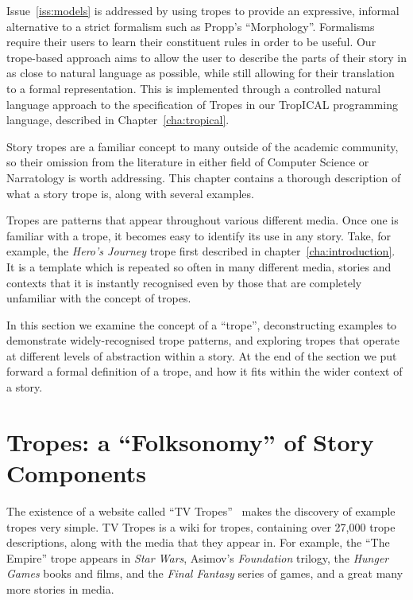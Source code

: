 \documentclass[11pt]{report}
\begin{document}
Issue~\ref{iss:models} is addressed by using tropes to provide an expressive, informal alternative to a strict formalism such as Propp's ``Morphology''. Formalisms require their users to learn their constituent rules in order to be useful. Our trope-based approach aims to allow the user to describe the parts of their story in as close to natural language as possible, while still allowing for their translation to a formal representation.
This is implemented through a controlled natural language approach to the specification of Tropes in our TropICAL programming language, described in Chapter~\ref{cha:tropical}.

Story tropes are a familiar concept to many outside of the academic
community, so their omission from the literature in either field of Computer
Science or Narratology is worth addressing. This chapter contains a thorough
description of what a story trope is, along with several examples.

Tropes are patterns that appear throughout various different media. Once one is familiar
with a trope, it becomes easy to identify its use in any story. Take, for
example, the \emph{Hero's Journey} trope first described in
chapter~\ref{cha:introduction}. It is a template which is repeated so often in
many different media, stories and contexts that it is instantly recognised even
by those that are completely unfamiliar with the concept of tropes.


In this section we examine the concept of a ``trope'', deconstructing examples
to demonstrate widely-recognised trope patterns, and exploring tropes that
operate at different levels of abstraction within a story. At the end of the
section we put forward a formal definition of a trope, and how it fits within the
wider context of a story.

\section{Tropes: a ``Folksonomy'' of Story Components}
The existence of a website called ``TV Tropes''~\citep{tvtropes} makes the discovery of example
tropes very simple. TV Tropes is a wiki for tropes, containing over 27,000
trope descriptions, along with the media that they appear in. For example, the
``The Empire'' trope appears in \emph{Star Wars}, Asimov's \emph{Foundation}
trilogy, the \emph{Hunger Games} books and films, and the \emph{Final Fantasy}
series of games, and a great many more stories in media.
\end{document}
